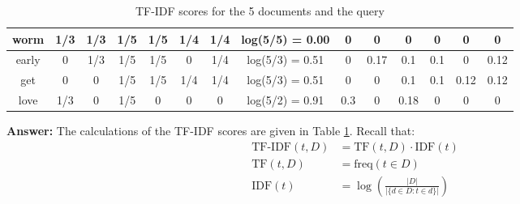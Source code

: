 \documentclass{article}
\newenvironment{QandA}{\begin{enumerate}[label=\arabic*.]}{\end{enumerate}}
\newenvironment{InnerQandA}{\begin{enumerate}[label=\roman*.]}{\end{enumerate}}
\newenvironment{answer}{\par\normalfont \textbf{Answer:}}{}
\begin{document}
\begin{QandA}
\begin{InnerQandA}
\begin{table}[h!]
\begin{tabular}{|c|cccccc|c|cccccc|}
            worm              & \multicolumn{1}{c|}{1/3} & \multicolumn{1}{c|}{1/3} & \multicolumn{1}{c|}{1/5} & \multicolumn{1}{c|}{1/5} & \multicolumn{1}{c|}{1/4} & 1/4 & log(5/5) = 0.00         & \multicolumn{1}{c|}{0}    & \multicolumn{1}{c|}{0}    & \multicolumn{1}{c|}{0}    & \multicolumn{1}{c|}{0}    & \multicolumn{1}{c|}{0}    & 0    \\ \hline
            early             & \multicolumn{1}{c|}{0}   & \multicolumn{1}{c|}{1/3} & \multicolumn{1}{c|}{1/5} & \multicolumn{1}{c|}{1/5} & \multicolumn{1}{c|}{0}   & 1/4 & log(5/3) = 0.51      & \multicolumn{1}{c|}{0}    & \multicolumn{1}{c|}{0.17} & \multicolumn{1}{c|}{0.1}  & \multicolumn{1}{c|}{0.1}  & \multicolumn{1}{c|}{0}    & 0.12 \\ \hline
            get               & \multicolumn{1}{c|}{0}   & \multicolumn{1}{c|}{0}   & \multicolumn{1}{c|}{1/5} & \multicolumn{1}{c|}{1/5} & \multicolumn{1}{c|}{1/4} & 1/4 & log(5/3) = 0.51      & \multicolumn{1}{c|}{0}    & \multicolumn{1}{c|}{0}    & \multicolumn{1}{c|}{0.1}  & \multicolumn{1}{c|}{0.1}  & \multicolumn{1}{c|}{0.12} & 0.12 \\ \hline
            love              & \multicolumn{1}{c|}{1/3} & \multicolumn{1}{c|}{0}   & \multicolumn{1}{c|}{1/5}  & \multicolumn{1}{c|}{0}   & \multicolumn{1}{c|}{0}   & 0   & log(5/2) = 0.91      & \multicolumn{1}{c|}{0.3}  & \multicolumn{1}{c|}{0}    & \multicolumn{1}{c|}{0.18} & \multicolumn{1}{c|}{0}    & \multicolumn{1}{c|}{0}    & 0    \\ \hline
            \end{tabular}
            \caption{TF-IDF scores for the 5 documents and the query}
            \label{tab:tf-idf-1}
            \end{table}
        \begin{answer}
            The calculations of the TF-IDF scores are given in Table \ref{tab:tf-idf-1}. Recall that:
            \begin{align*}
                \text{TF-IDF}(t, D) &= \text{TF}(t, D) \cdot \text{IDF}(t) \\
                \text{TF}(t, D) &= \text{freq}(t \in D) \\
                \text{IDF}(t) &= \log \left( \frac{\vert D \vert}{\vert \{ d \in D: t \in d \}\vert}\right)
            \end{align*}
            

\end{answer}
\end{InnerQandA}
\end{QandA}
\end{document}
